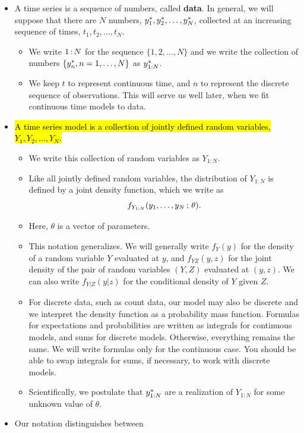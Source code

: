 \documentclass[]{article}
\begin{document}
\begin{itemize}
\item
  A time series is a sequence of numbers, called \textbf{data}. In
  general, we will suppose that there are \(N\) numbers,
  \(y_1^*,y_2^*,\dots,y_N^*\), collected at an increasing
  sequence of times, \(t_1,t_2,\dots,t_N\).

  \begin{itemize}
  \item
    We write \(1{\,{:}\,}N\) for the sequence \(\{1,2,\dots,N\}\) and
    we write the collection of numbers \(\{y_n^*, n=1,\dots,N\}\)
    as \(y_{1:N}^*\).
  \item
    We keep \(t\) to represent continuous time, and \(n\) to represent
    the discrete sequence of observations. This will serve us well
    later, when we fit continuous time models to data.
  \end{itemize}
\item
  \hl{A time series model is a collection of jointly defined random
  variables, $Y_1,Y_2,\dots,Y_N$.}

  \begin{itemize}
  \item
    We write this collection of random variables as \(Y_{1:N}\).
  \item
    Like all jointly defined random variables, the distribution of
    \(Y_{1:N}\) is defined by a joint density function, which we write
    as \[ f_{Y_{1:N}}(y_1,\dots,y_N \, ; \, \theta).\]
  \item
    Here, \(\theta\) is a vector of parameters.
  \item
    This notation generalizes. We will generally write \(f_Y(y)\) for
    the density of a random variable \(Y\) evaluated at \(y\), and
    \(f_{YZ}(y,z)\) for the joint density of the pair of random
    variables \((Y,Z)\) evaluated at \((y,z)\). We can also write
    \(f_{Y|Z}(y|z)\) for the conditional density of \(Y\) given \(Z\).
  \item
    For discrete data, such as count data, our model may also be
    discrete and we interpret the density function as a probability mass
    function. Formulas for expectations and probabilities are written as
    integrals for continuous models, and sums for discrete models.
    Otherwise, everything remains the same. We will write formulas only
    for the continuous case. You should be able to swap integrals for
    sums, if necessary, to work with discrete models.
  \item
    Scientifically, we postulate that \(y_{1:N}^*\) are a
    realization of \(Y_{1:N}\) for some unknown value of \(\theta\).
  \end{itemize}
\item
  Our notation distinguishes between


\end{itemize}
\end{document}
